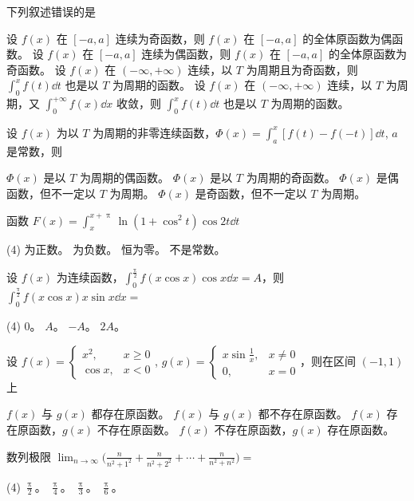 \begin{ti}
	下列叙述错误的是
	\begin{tasks}
		\task 设 $f(x)$ 在 $[-a,a]$ 连续为奇函数，则 $f(x)$ 在 $[-a,a]$ 的全体原函数为偶函数。
		\task 设 $f(x)$ 在 $[-a,a]$ 连续为偶函数，则 $f(x)$ 在 $[-a,a]$ 的全体原函数为奇函数。
		\task 设 $f(x)$ 在 $(-\infty,+\infty)$ 连续，以 $T$ 为周期且为奇函数，则 $\int_0^x f(t) \dd{t}$ 也是以 $T$ 为周期的函数。
		\task 设 $f(x)$ 在 $(-\infty,+\infty)$ 连续，以 $T$ 为周期，又 $\int_0^{+\infty} f(x) \dd{x}$ 收敛，则 $\int_0^x f(t) \dd{t}$ 也是以 $T$ 为周期的函数。
	\end{tasks}
\end{ti}

\begin{ti}
	设 $f(x)$ 为以 $T$ 为周期的非零连续函数，$\varPhi(x) = \int_a^x [f(t) - f(-t)] \dd{t}$, $a$ 是常数，则
	\begin{tasks}
		\task $\varPhi(x)$ 是以 $T$ 为周期的偶函数。
		\task $\varPhi(x)$ 是以 $T$ 为周期的奇函数。
		\task $\varPhi(x)$ 是偶函数，但不一定以 $T$ 为周期。
		\task $\varPhi(x)$ 是奇函数，但不一定以 $T$ 为周期。
	\end{tasks}
\end{ti}

\begin{ti}
	函数 $F(x) = \int_x^{x+\uppi} \ln(1+\cos^2t) \cos 2t \dd{t}$
	\begin{tasks}(4)
		\task 为正数。
		\task 为负数。
		\task 恒为零。
		\task 不是常数。
	\end{tasks}
\end{ti}

\begin{ti}
	设 $f(x)$ 为连续函数，$\int_0^{\frac{\uppi}{2}} f(x \cos x) \cos x \dd{x} = A$，则 $\int_0^{\frac{\uppi}{2}} f(x \cos x) x \sin x \dd{x} = $
	\begin{tasks}(4)
		\task $0$。
		\task $A$。
		\task $-A$。
		\task $2A$。
	\end{tasks}
\end{ti}

\begin{ti}
	设 $f(x) = \begin{cases}
		x^2, & x \geq 0 \\
		\cos x, & x < 0
	\end{cases}$, $g(x) = \begin{cases}
		x \sin \frac{1}{x}, & x \ne 0 \\
		0, & x = 0
	\end{cases}$，则在区间 $(-1,1)$ 上
	\begin{tasks}
		\task $f(x)$ 与 $g(x)$ 都存在原函数。
		\task $f(x)$ 与 $g(x)$ 都不存在原函数。
		\task $f(x)$ 存在原函数，$g(x)$ 不存在原函数。
		\task $f(x)$ 不存在原函数，$g(x)$ 存在原函数。
	\end{tasks}
\end{ti}

\begin{ti}
	数列极限 $\lim_{n \to \infty} \biggl( \frac{n}{n^2+1^2} + \frac{n}{n^2+2^2} + \cdots + \frac{n}{n^2+n^2} \biggr) = $
	\begin{tasks}(4)
		\task $\frac{\uppi}{2}$。
		\task $\frac{\uppi}{4}$。
		\task $\frac{\uppi}{3}$。
		\task $\frac{\uppi}{6}$。
	\end{tasks}
\end{ti}